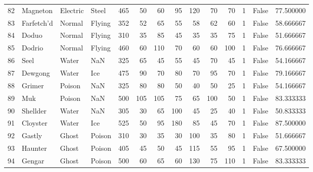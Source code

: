\begin{tabular}{rlllrrrrrrrrlr}
  82 &                   Magneton &  Electric &     Steel &    465 &   50 &      60 &       95 &      120 &       70 &     70 &           1 &      False &   77.500000 \\
  83 &                 Farfetch'd &    Normal &    Flying &    352 &   52 &      65 &       55 &       58 &       62 &     60 &           1 &      False &   58.666667 \\
  84 &                      Doduo &    Normal &    Flying &    310 &   35 &      85 &       45 &       35 &       35 &     75 &           1 &      False &   51.666667 \\
  85 &                     Dodrio &    Normal &    Flying &    460 &   60 &     110 &       70 &       60 &       60 &    100 &           1 &      False &   76.666667 \\
  86 &                       Seel &     Water &       NaN &    325 &   65 &      45 &       55 &       45 &       70 &     45 &           1 &      False &   54.166667 \\
  87 &                    Dewgong &     Water &       Ice &    475 &   90 &      70 &       80 &       70 &       95 &     70 &           1 &      False &   79.166667 \\
  88 &                     Grimer &    Poison &       NaN &    325 &   80 &      80 &       50 &       40 &       50 &     25 &           1 &      False &   54.166667 \\
  89 &                        Muk &    Poison &       NaN &    500 &  105 &     105 &       75 &       65 &      100 &     50 &           1 &      False &   83.333333 \\
  90 &                   Shellder &     Water &       NaN &    305 &   30 &      65 &      100 &       45 &       25 &     40 &           1 &      False &   50.833333 \\
  91 &                   Cloyster &     Water &       Ice &    525 &   50 &      95 &      180 &       85 &       45 &     70 &           1 &      False &   87.500000 \\
  92 &                     Gastly &     Ghost &    Poison &    310 &   30 &      35 &       30 &      100 &       35 &     80 &           1 &      False &   51.666667 \\
  93 &                    Haunter &     Ghost &    Poison &    405 &   45 &      50 &       45 &      115 &       55 &     95 &           1 &      False &   67.500000 \\
  94 &                     Gengar &     Ghost &    Poison &    500 &   60 &      65 &       60 &      130 &       75 &    110 &           1 &      False &   83.333333 \\

\end{tabular}
